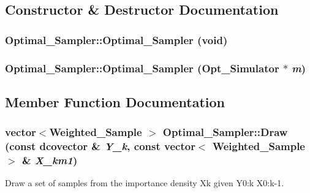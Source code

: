 \subsection{Constructor \& Destructor Documentation}
\hypertarget{class_optimal___sampler_0d07b22c5c1e33ecd586059dd5cf739e}{
\subsubsection[{Optimal\_\-Sampler}]{\setlength{\rightskip}{0pt plus 5cm}Optimal\_\-Sampler::Optimal\_\-Sampler (void)}}
\label{class_optimal___sampler_0d07b22c5c1e33ecd586059dd5cf739e}


\hypertarget{class_optimal___sampler_c93d1bd8e4855c1867f51b941060717b}{
\subsubsection[{Optimal\_\-Sampler}]{\setlength{\rightskip}{0pt plus 5cm}Optimal\_\-Sampler::Optimal\_\-Sampler ({\bf Opt\_\-Simulator} $\ast$ {\em m})}}
\label{class_optimal___sampler_c93d1bd8e4855c1867f51b941060717b}




\subsection{Member Function Documentation}
\hypertarget{class_optimal___sampler_1a9288b91deaab91d0c3d3511d6e1892}{
\subsubsection[{Draw}]{\setlength{\rightskip}{0pt plus 5cm}vector$<${\bf Weighted\_\-Sample} $>$ Optimal\_\-Sampler::Draw (const dcovector \& {\em Y\_\-k}, \/  const vector$<$ {\bf Weighted\_\-Sample} $>$ \& {\em X\_\-km1})}}
\label{class_optimal___sampler_1a9288b91deaab91d0c3d3511d6e1892}


Draw a set of samples from the importance density Xk given Y0:k X0:k-1. 

